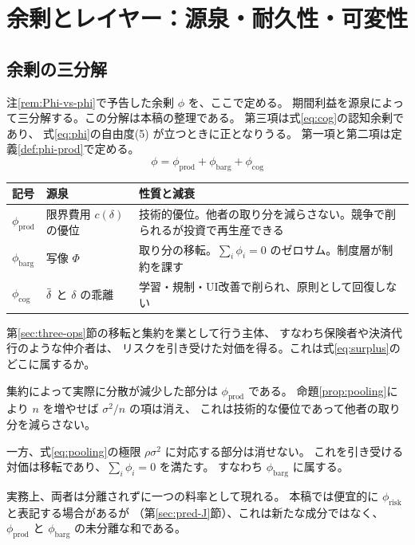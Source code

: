 \chapter{余剰とレイヤー：源泉・耐久性・可変性}
\label{sec:surplus}

\section{余剰の三分解}
\label{sec:surplus-decomp}

注\ref{rem:Phi-vs-phi}で予告した余剰 $\phi$ を、ここで定める。
期間利益を源泉によって三分解する。この分解は本稿の整理である。
第三項は式\eqref{eq:cog}の認知余剰であり、
式\eqref{eq:phi}の自由度(5) が立つときに正となりうる。
第一項と第二項は定義\ref{def:phi-prod}で定める。
\begin{equation}
\phi = \phi_{\mathrm{prod}} + \phi_{\mathrm{barg}} + \phi_{\mathrm{cog}}
\label{eq:surplus}
\end{equation}

\begin{center}
\begin{tabularx}{\textwidth}{@{}llX@{}}
\toprule
記号 & 源泉 & 性質と減衰 \\
\midrule
$\phi_{\mathrm{prod}}$ & 限界費用 $c(\delta)$ の優位 & 技術的優位。他者の取り分を減らさない。競争で削られるが投資で再生産できる \\
$\phi_{\mathrm{barg}}$ & 写像 $\Phi$ & 取り分の移転。$\sum_i \phi_i = 0$ のゼロサム。制度層が制約を課す \\
$\phi_{\mathrm{cog}}$ & $\dbar$ と $\delta$ の乖離 & 学習・規制・UI改善で削られ、原則として回復しない \\
\bottomrule
\end{tabularx}
\label{tab:surplus-decomposition}
\end{center}

\begin{remark}[リスク引受の対価はどこに入るか]
\label{rem:phi-risk}
第\ref{sec:three-ops}節の移転と集約を業として行う主体、
すなわち保険者や決済代行のような仲介者は、
リスクを引き受けた対価を得る。これは式\eqref{eq:surplus}のどこに属するか。

集約によって実際に分散が減少した部分は $\phi_{\mathrm{prod}}$ である。
命題\ref{prop:pooling}により $n$ を増やせば $\sigma^2/n$ の項は消え、
これは技術的な優位であって他者の取り分を減らさない。

一方、式\eqref{eq:pooling}の極限 $\rho\sigma^2$ に対応する部分は消せない。
これを引き受ける対価は移転であり、$\sum_i\phi_i=0$ を満たす。
すなわち $\phi_{\mathrm{barg}}$ に属する。

実務上、両者は分離されずに一つの料率として現れる。
本稿では便宜的に $\phi_{\mathrm{risk}}$ と表記する場合があるが
（第\ref{sec:pred-J}節）、これは新たな成分ではなく、
$\phi_{\mathrm{prod}}$ と $\phi_{\mathrm{barg}}$ の未分離な和である。
\end{remark}

